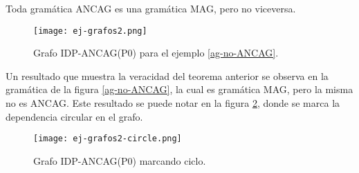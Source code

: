\begin{theorem}
\label{th:ancag2}
Toda gramática ANCAG es una gramática MAG, pero no viceversa.
\end{theorem}

\begin{figure}\centering
\texttt{[image: ej-grafos2.png]}
\caption{\label{idp-wuu-yang}Grafo IDP-ANCAG(P0) para el ejemplo \ref{ag-no-ANCAG}.}
\end{figure}

Un resultado que muestra la veracidad del teorema anterior se observa en la gramática de la figura \ref{ag-no-ANCAG}, la cual es gramática MAG, pero la misma no es ANCAG. Este resultado se puede notar en la figura \ref{ancag-circle}, donde se marca la dependencia circular en el grafo.

\begin{figure}[!ht]\centering
\texttt{[image: ej-grafos2-circle.png]}
\caption{\label{ancag-circle} Grafo IDP-ANCAG(P0) marcando ciclo.}
\end{figure}
